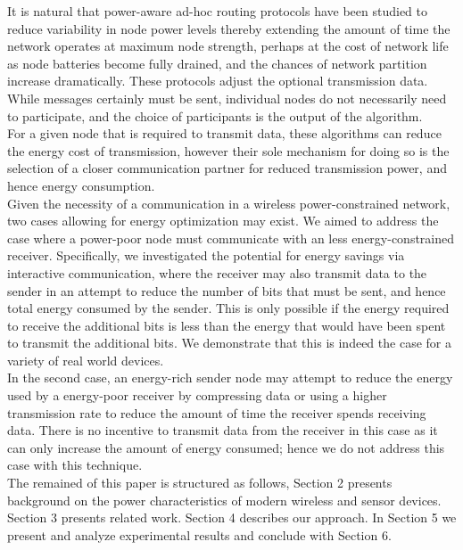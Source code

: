 It is natural that power-aware ad-hoc routing protocols have been
studied to reduce variability in node power levels thereby extending
the amount of time the network operates at maximum node strength,
perhaps at the cost of network life as node batteries become fully
drained, and the chances of network partition increase dramatically.
These protocols adjust the optional transmission data.  While messages
certainly must be sent, individual nodes do not necessarily need to
participate, and the choice of participants is the output of the
algorithm.\\

For a given node that is required to transmit data, these algorithms
can reduce the energy cost of transmission, however their sole
mechanism for doing so is the selection of a closer communication
partner for reduced transmission power, and hence energy
consumption.\\

Given the necessity of a communication in a wireless power-constrained
network, two cases allowing for energy optimization may exist.  We
aimed to address the case where a power-poor node must communicate
with an less energy-constrained receiver.  Specifically, we
investigated the potential for energy savings via interactive
communication, where the receiver may also transmit data to the sender
in an attempt to reduce the number of bits that must be sent, and
hence total energy consumed by the sender.  This is only possible if
the energy required to receive the additional bits is less than the
energy that would have been spent to transmit the additional bits.  We
demonstrate that this is indeed the case for a variety of real world
devices.\\

In the second case, an energy-rich sender node may attempt to reduce the
energy used by a energy-poor receiver by compressing data or using a
higher transmission rate to reduce the amount of time the receiver
spends receiving data.  There is no incentive to transmit data from
the receiver in this case as it can only increase the amount of energy
consumed; hence we do not address this case with this technique.\\

The remained of this paper is structured as follows, Section 2
presents background on the power characteristics of modern wireless
and sensor devices.  Section 3 presents related work.  Section 4
describes our approach.  In Section 5 we present and analyze experimental
results and conclude with Section 6.\\

